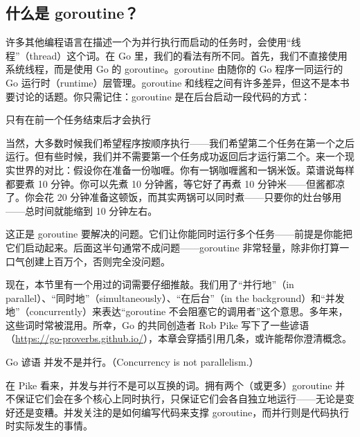 \subsection{什么是 goroutine？}

许多其他编程语言在描述一个为并行执行而启动的任务时，会使用``线程''（thread）这个词。在 Go 里，我们的看法有所不同。首先，我们不直接使用系统线程，而是使用 Go 的 goroutine。goroutine 由随你的 Go 程序一同运行的 Go 运行时（runtime）层管理。goroutine 和线程之间有许多差异，但这不是本书要讨论的话题。你只需记住：goroutine 是在后台启动一段代码的方式：


\begin{codeannotations}
\item 只有在前一个任务结束后才会执行
\end{codeannotations}

当然，大多数时候我们希望程序按顺序执行——我们希望第二个任务在第一个之后运行。但有些时候，我们并不需要第一个任务成功返回后才运行第二个。来一个现实世界的对比：假设你在准备一份咖喱。你有一锅咖喱酱和一锅米饭。菜谱说每样都要煮 10 分钟。你可以先煮 10 分钟酱，等它好了再煮 10 分钟米——但酱都凉了。你会花 20 分钟准备这顿饭，而其实两锅可以同时煮——只要你的灶台够用——总时间就能缩到 10 分钟左右。

这正是 goroutine 要解决的问题。它们让你能同时运行多个任务——前提是你能把它们启动起来。后面这半句通常不成问题——goroutine 非常轻量，除非你打算一口气创建上百万个，否则完全没问题。

现在，本节里有一个用过的词需要仔细推敲。我们用了``并行地''（in parallel）、``同时地''（simultaneously）、``在后台''（in the background）和``并发地''（concurrently）来表达``goroutine 不会阻塞它的调用者''这个意思。多年来，这些词时常被混用。所幸，Go 的共同创造者 Rob Pike 写下了一些谚语（\url{https://go-proverbs.github.io/}），本章会穿插引用几条，或许能帮你澄清概念。

\begin{tipbox}{Go 谚语}
并发不是并行。（Concurrency is not parallelism.）
\end{tipbox}

在 Pike 看来，并发与并行不是可以互换的词。拥有两个（或更多）goroutine 并不保证它们会在多个核心上同时执行，只保证它们会各自独立地运行——无论是变好还是变糟。并发关注的是如何编写代码来支撑 goroutine，而并行则是代码执行时实际发生的事情。

